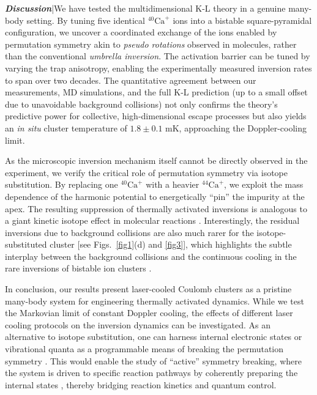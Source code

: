 \documentclass[aps,prl,twocolumn,superscriptaddress,showpacs,floatfix]{revtex4-2}
\begin{document}
{\it \textbf{Discussion}}|We have tested the multidimensional K-L theory in a genuine many-body setting. By tuning five identical $^{40}\mathrm{Ca}^+$ ions into a bistable square-pyramidal configuration, we uncover a coordinated exchange of the ions enabled by permutation symmetry akin to {\it pseudo rotations} observed in molecules, rather than the conventional {\it umbrella inversion}. The activation barrier can be tuned by varying the trap anisotropy, enabling the experimentally measured inversion rates to span over two decades. The quantitative agreement between our measurements, MD simulations, and the full K-L prediction (up to a small offset due to unavoidable background collisions) not only confirms the theory's predictive power for collective, high-dimensional escape processes but also yields an \textit{in situ} cluster temperature of $1.8 \pm 0.1$ mK, approaching the Doppler-cooling limit.

As the microscopic inversion mechanism itself cannot be directly observed in the experiment, we verify the critical role of permutation symmetry via isotope substitution. By replacing one $^{40}\mathrm{Ca}^+$ with a heavier $^{44}\mathrm{Ca}^+$, we exploit the mass dependence of the harmonic potential to energetically ``pin'' the impurity at the apex. The resulting suppression of thermally activated inversions is analogous to a giant kinetic isotope effect in molecular reactions \cite{Zhao_2017, Petralia_2020}. Interestingly, the residual inversions due to background collisions are also much rarer for the isotope-substituted cluster [see Figs.~\ref{fig1}(d) and \ref{fig3}], which highlights the subtle interplay between the background collisions and the continuous cooling in the rare inversions of bistable ion clusters \cite{Pagano_2019}.

In conclusion, our results present laser-cooled Coulomb clusters as a pristine many-body system for engineering thermally activated dynamics. While we test the Markovian limit of constant Doppler cooling, the effects of different laser cooling protocols \cite{toschek_raman_cooling, rossnagel_thermometry, Neeve_2025} on the inversion dynamics can be investigated. As an alternative to isotope substitution, one can harness internal electronic states or vibrational quanta as a programmable means of breaking the permutation symmetry \cite{RevModPhys_Monroe, Mazzanti_2023, Sun_2024}. This would enable the study of ``active'' symmetry breaking, where the system is driven to specific reaction pathways by coherently preparing the internal states \cite{mallweger2025}, thereby bridging reaction kinetics and quantum control.
\end{document}
